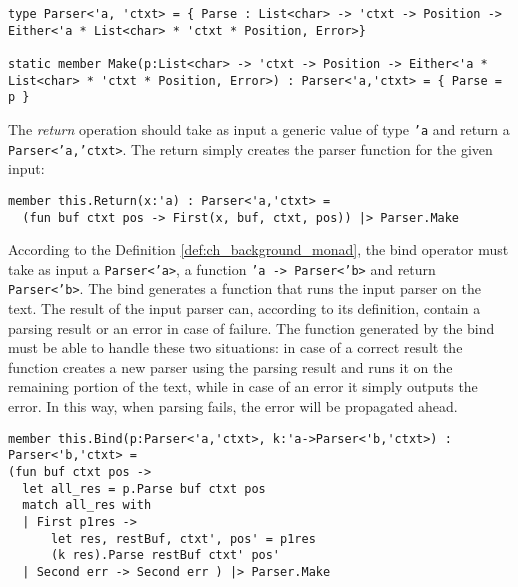\begin{lstlisting}
type Parser<'a, 'ctxt> = { Parse : List<char> -> 'ctxt -> Position -> Either<'a * List<char> * 'ctxt * Position, Error>}

static member Make(p:List<char> -> 'ctxt -> Position -> Either<'a * List<char> * 'ctxt * Position, Error>) : Parser<'a,'ctxt> = { Parse = p }
\end{lstlisting}

The \textit{return} operation should take as input a generic value of type \texttt{'a} and return a \texttt{Parser<'a,'ctxt>}. The return simply creates the parser function for the given input:

\begin{lstlisting}
member this.Return(x:'a) : Parser<'a,'ctxt> =
  (fun buf ctxt pos -> First(x, buf, ctxt, pos)) |> Parser.Make
\end{lstlisting}

According to the Definition \ref{def:ch_background_monad}, the bind operator must take as input a \texttt{Parser<'a>}, a function \texttt{'a -> Parser<'b>} and return \texttt{Parser<'b>}. The bind generates a function that runs the input parser on the text. The result of the input parser can, according to its definition, contain a parsing result or an error in case of failure. The function generated by the bind must be able to handle these two situations: in case of a correct result the function creates a new parser using the parsing result and runs it on the remaining portion of the text, while in case of an error it simply outputs the error. In this way, when parsing fails, the error will be propagated ahead.

\begin{lstlisting}
member this.Bind(p:Parser<'a,'ctxt>, k:'a->Parser<'b,'ctxt>) : Parser<'b,'ctxt> =
(fun buf ctxt pos ->
  let all_res = p.Parse buf ctxt pos
  match all_res with
  | First p1res ->
      let res, restBuf, ctxt', pos' = p1res
      (k res).Parse restBuf ctxt' pos'
  | Second err -> Second err ) |> Parser.Make
\end{lstlisting}

